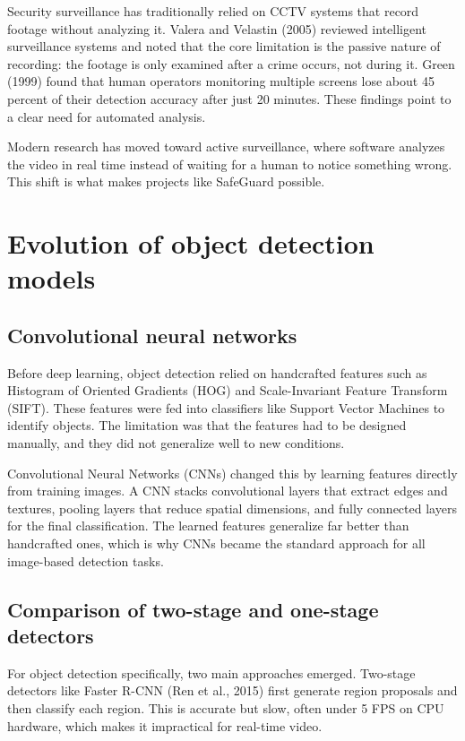 \documentclass[12pt,a4paper]{report}
\begin{document}
Security surveillance has traditionally relied on CCTV systems that record footage without analyzing it. Valera and Velastin (2005) reviewed intelligent surveillance systems and noted that the core limitation is the passive nature of recording: the footage is only examined after a crime occurs, not during it. Green (1999) found that human operators monitoring multiple screens lose about 45 percent of their detection accuracy after just 20 minutes. These findings point to a clear need for automated analysis.

Modern research has moved toward active surveillance, where software analyzes the video in real time instead of waiting for a human to notice something wrong. This shift is what makes projects like SafeGuard possible.

\section{Evolution of object detection models}

\subsection{Convolutional neural networks}

Before deep learning, object detection relied on handcrafted features such as Histogram of Oriented Gradients (HOG) and Scale-Invariant Feature Transform (SIFT). These features were fed into classifiers like Support Vector Machines to identify objects. The limitation was that the features had to be designed manually, and they did not generalize well to new conditions.

Convolutional Neural Networks (CNNs) changed this by learning features directly from training images. A CNN stacks convolutional layers that extract edges and textures, pooling layers that reduce spatial dimensions, and fully connected layers for the final classification. The learned features generalize far better than handcrafted ones, which is why CNNs became the standard approach for all image-based detection tasks.

\subsection{Comparison of two-stage and one-stage detectors}

For object detection specifically, two main approaches emerged. Two-stage detectors like Faster R-CNN (Ren et al., 2015) first generate region proposals and then classify each region. This is accurate but slow, often under 5 FPS on CPU hardware, which makes it impractical for real-time video.
\end{document}
